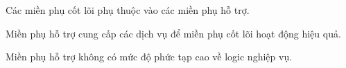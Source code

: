 

Các miền phụ cốt lõi phụ thuộc vào các miền phụ hỗ trợ.

Miền phụ hỗ trợ cung cấp các dịch vụ để miền phụ cốt lõi hoạt động hiệu quả.

Miền phụ hỗ trợ không có mức độ phức tạp cao về logic nghiệp vụ.












